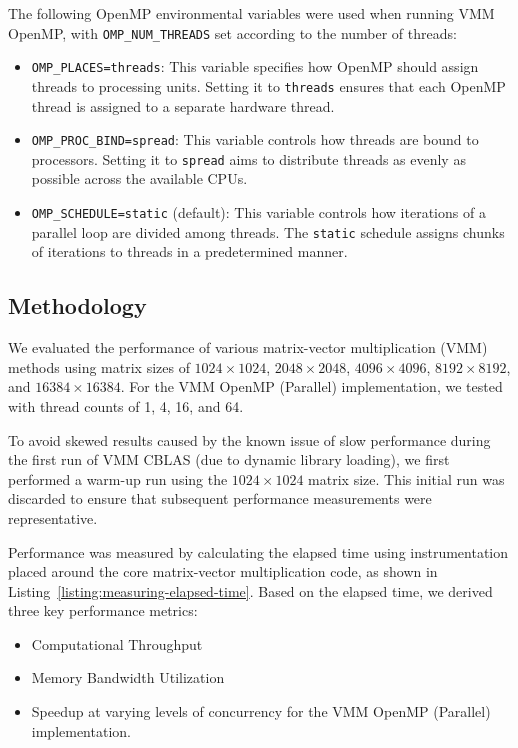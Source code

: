 The following OpenMP environmental variables were used when running VMM OpenMP, with \texttt{OMP\_NUM\_THREADS} set according to the number of threads:
\begin{itemize}
    \item \texttt{OMP\_PLACES=threads}: This variable specifies how OpenMP should assign threads to processing units. Setting it to \texttt{threads} ensures that each OpenMP thread is assigned to a separate hardware thread.
    
    \item \texttt{OMP\_PROC\_BIND=spread}: This variable controls how threads are bound to processors. Setting it to 	\texttt{spread} aims to distribute threads as evenly as possible across the available CPUs.
    
    \item \texttt{OMP\_SCHEDULE=static} (default): This variable controls how iterations of a parallel loop are divided among threads. The \texttt{static} schedule assigns chunks of iterations to threads in a predetermined manner.
\end{itemize}


\subsection{Methodology}
\label{sec:methodology}
We evaluated the performance of various matrix-vector multiplication (VMM) methods using matrix sizes of \(1024 \times 1024\), \(2048 \times 2048\), \(4096 \times 4096\), \(8192 \times 8192\), and \(16384 \times 16384\). For the VMM OpenMP (Parallel) implementation, we tested with thread counts of 1, 4, 16, and 64. 

To avoid skewed results caused by the known issue of slow performance during the first run of VMM CBLAS (due to dynamic library loading), we first performed a warm-up run using the \(1024 \times 1024\) matrix size. This initial run was discarded to ensure that subsequent performance measurements were representative. 

Performance was measured by calculating the elapsed time using instrumentation placed around the core matrix-vector multiplication code, as shown in Listing~\ref{listing:measuring-elapsed-time}. Based on the elapsed time, we derived three key performance metrics: 
\begin{itemize}
    \item Computational Throughput
    \item Memory Bandwidth Utilization
    \item Speedup at varying levels of concurrency for the VMM OpenMP (Parallel) implementation.
\end{itemize}

